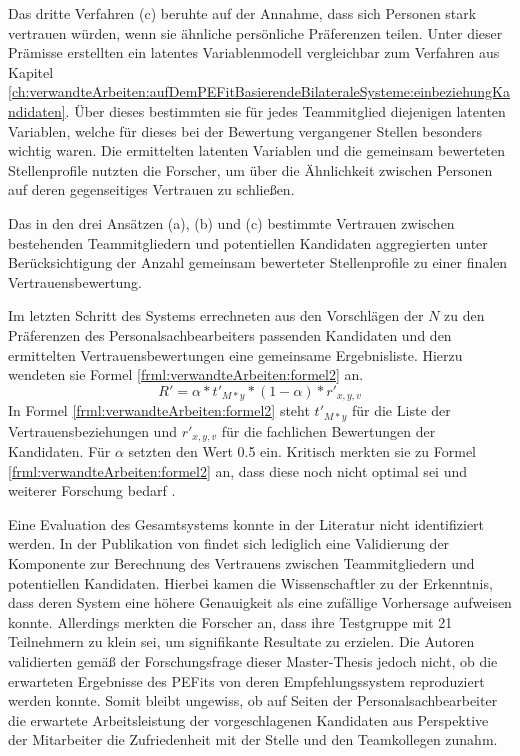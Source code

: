 Das dritte Verfahren (c) beruhte auf der Annahme, dass sich Personen stark vertrauen würden, wenn sie ähnliche persönliche Präferenzen teilen. Unter dieser Prämisse erstellten \textcite[S. 6f.]{malinowski:2005} ein latentes Variablenmodell vergleichbar zum Verfahren aus Kapitel \ref{ch:verwandteArbeiten:aufDemPEFitBasierendeBilateraleSysteme:einbeziehungKandidaten}. Über dieses bestimmten sie für jedes Teammitglied diejenigen latenten Variablen, welche für dieses bei der Bewertung vergangener Stellen besonders wichtig waren. Die ermittelten latenten Variablen und die gemeinsam bewerteten Stellenprofile nutzten die Forscher, um über die Ähnlichkeit zwischen Personen auf deren gegenseitiges Vertrauen zu schließen.

Das in den drei Ansätzen (a), (b) und (c) bestimmte Vertrauen zwischen bestehenden Teammitgliedern und potentiellen Kandidaten aggregierten \textcite[S. 7ff.]{malinowski:2005} unter Berücksichtigung der Anzahl gemeinsam bewerteter Stellenprofile zu einer finalen Vertrauensbewertung.

Im letzten Schritt des Systems errechneten \textcite[S. 9f.]{malinowski:2005} aus den Vorschlägen der $N$ zu den Präferenzen des Personalsachbearbeiters passenden Kandidaten und den ermittelten Vertrauensbewertungen eine gemeinsame Ergebnisliste. Hierzu wendeten sie Formel \ref{frml:verwandteArbeiten:formel2} an.
\begin{equation}
	R' = \alpha * t'_{M*y} * (1-\alpha) * r'_{x,y,v}
	\label{frml:verwandteArbeiten:formel2}
\end{equation}
In Formel \ref{frml:verwandteArbeiten:formel2} steht $t'_{M*y}$ für die Liste der Vertrauensbeziehungen und $r'_{x,y,v}$ für die fachlichen Bewertungen der Kandidaten. Für $\alpha$ setzten \textcite[S. 4ff.]{malinowski:2005} den Wert 0.5 ein. Kritisch merkten sie zu Formel \ref{frml:verwandteArbeiten:formel2} an, dass diese noch nicht optimal sei und weiterer Forschung bedarf \cite[S. 9]{malinowski:2005}.

Eine Evaluation des Gesamtsystems konnte in der Literatur nicht identifiziert werden. In der Publikation von \textcite[S. 13ff.]{malinowski:2008} findet sich lediglich eine Validierung der Komponente zur Berechnung des Vertrauens zwischen Teammitgliedern und potentiellen Kandidaten. Hierbei kamen die Wissenschaftler zu der Erkenntnis, dass deren System eine höhere Genauigkeit als eine zufällige Vorhersage aufweisen konnte. Allerdings merkten die Forscher an, dass ihre Testgruppe mit 21 Teilnehmern zu klein sei, um signifikante Resultate zu erzielen. Die Autoren validierten gemäß der Forschungsfrage dieser Master-Thesis jedoch nicht, ob die erwarteten Ergebnisse des \acp{PEFit} von deren Empfehlungssystem reproduziert werden konnte. Somit bleibt ungewiss, ob auf Seiten der Personalsachbearbeiter die erwartete Arbeitsleistung der vorgeschlagenen Kandidaten aus Perspektive der Mitarbeiter die Zufriedenheit mit der Stelle und den Teamkollegen zunahm.

